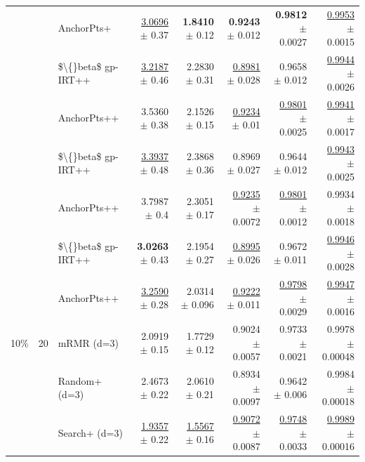 \begin{longtable}{llp{}rrrrr}
 &  & AnchorPts+ & \underline{3.0696} {\scriptsize $\pm$ 0.37} & \textbf{1.8410} {\scriptsize $\pm$ 0.12} & \textbf{0.9243} {\scriptsize $\pm$ 0.012} & \textbf{0.9812} {\scriptsize $\pm$ 0.0027} & \underline{0.9953} {\scriptsize $\pm$ 0.0015} \\
 &  & \$\textbackslash\{\}beta\$ gp-IRT++ & \underline{3.2187} {\scriptsize $\pm$ 0.46} & 2.2830 {\scriptsize $\pm$ 0.31} & \underline{0.8981} {\scriptsize $\pm$ 0.028} & 0.9658 {\scriptsize $\pm$ 0.012} & \underline{0.9944} {\scriptsize $\pm$ 0.0026} \\
 &  & AnchorPts++ & 3.5360 {\scriptsize $\pm$ 0.38} & 2.1526 {\scriptsize $\pm$ 0.15} & \underline{0.9234} {\scriptsize $\pm$ 0.01} & \underline{0.9801} {\scriptsize $\pm$ 0.0025} & \underline{0.9941} {\scriptsize $\pm$ 0.0017} \\
 &  & \$\textbackslash\{\}beta\$ gp-IRT++ & \underline{3.3937} {\scriptsize $\pm$ 0.48} & 2.3868 {\scriptsize $\pm$ 0.36} & 0.8969 {\scriptsize $\pm$ 0.027} & 0.9644 {\scriptsize $\pm$ 0.012} & \underline{0.9943} {\scriptsize $\pm$ 0.0025} \\
 &  & AnchorPts++ & 3.7987 {\scriptsize $\pm$ 0.4} & 2.3051 {\scriptsize $\pm$ 0.17} & \underline{0.9235} {\scriptsize $\pm$ 0.0072} & \underline{0.9801} {\scriptsize $\pm$ 0.0012} & 0.9934 {\scriptsize $\pm$ 0.0018} \\
 &  & \$\textbackslash\{\}beta\$ gp-IRT++ & \textbf{3.0263} {\scriptsize $\pm$ 0.43} & 2.1954 {\scriptsize $\pm$ 0.27} & \underline{0.8995} {\scriptsize $\pm$ 0.026} & 0.9672 {\scriptsize $\pm$ 0.011} & \underline{0.9946} {\scriptsize $\pm$ 0.0028} \\
 &  & AnchorPts++ & \underline{3.2590} {\scriptsize $\pm$ 0.28} & 2.0314 {\scriptsize $\pm$ 0.096} & \underline{0.9222} {\scriptsize $\pm$ 0.011} & \underline{0.9798} {\scriptsize $\pm$ 0.0029} & \underline{0.9947} {\scriptsize $\pm$ 0.0016} \\
\midrule
10\% & 20 & mRMR (d=3) & 2.0919 {\scriptsize $\pm$ 0.15} & 1.7729 {\scriptsize $\pm$ 0.12} & 0.9024 {\scriptsize $\pm$ 0.0057} & 0.9733 {\scriptsize $\pm$ 0.0021} & 0.9978 {\scriptsize $\pm$ 0.00048} \\
 &  & Random+ (d=3) & 2.4673 {\scriptsize $\pm$ 0.22} & 2.0610 {\scriptsize $\pm$ 0.21} & 0.8934 {\scriptsize $\pm$ 0.0097} & 0.9642 {\scriptsize $\pm$ 0.006} & 0.9984 {\scriptsize $\pm$ 0.00018} \\
 &  & Search+ (d=3) & \underline{1.9357} {\scriptsize $\pm$ 0.22} & \underline{1.5567} {\scriptsize $\pm$ 0.16} & \underline{0.9072} {\scriptsize $\pm$ 0.0087} & \underline{0.9748} {\scriptsize $\pm$ 0.0033} & \underline{0.9989} {\scriptsize $\pm$ 0.00016} \\

\end{longtable}
